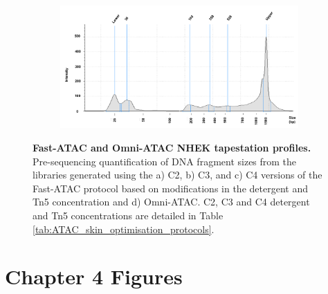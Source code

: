 \begin{figure}[htbp]
\begin{subfigure}{0.60\textwidth}
\caption{\textbf{}} %
\end{subfigure}
\begin{subfigure}{0.60\textwidth}
\centering
\includegraphics[width=\textwidth]{./Appendix/pdfs/Chapter3/Omni_ATAC_NHEK_Rep1_tapestation}
\caption{\textbf{}} %
\end{subfigure}
\hfill
\caption[Fast-ATAC and Omni-ATAC NHEK tapestation profiles.]{\textbf{Fast-ATAC and Omni-ATAC NHEK tapestation profiles.} Pre-sequencing quantification of DNA fragment sizes from the libraries generated  using the a) C2, b) C3, and c) C4 versions of the Fast-ATAC protocol based on modifications in the detergent and Tn5 concentration and d) Omni-ATAC. C2, C3 and C4 detergent and Tn5 concentrations are detailed in Table \ref{tab:ATAC_skin_optimisation_protocols}.}
\label{figure:NHEK_tapestation}
\end{figure}


\clearpage


\section{Chapter 4 Figures}

